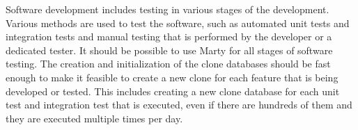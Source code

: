 Software development includes testing in various stages of the development.
Various methods are used to test the software, such as automated unit tests and integration tests and manual testing that is performed by the developer or a dedicated tester.
It should be possible to use Marty for all stages of software testing.
The creation and initialization of the clone databases should be fast enough to make it feasible to create a new clone for each feature that is being developed or tested.
This includes creating a new clone database for each unit test and integration test that is executed, even if there are hundreds of them and they are executed multiple times per day.